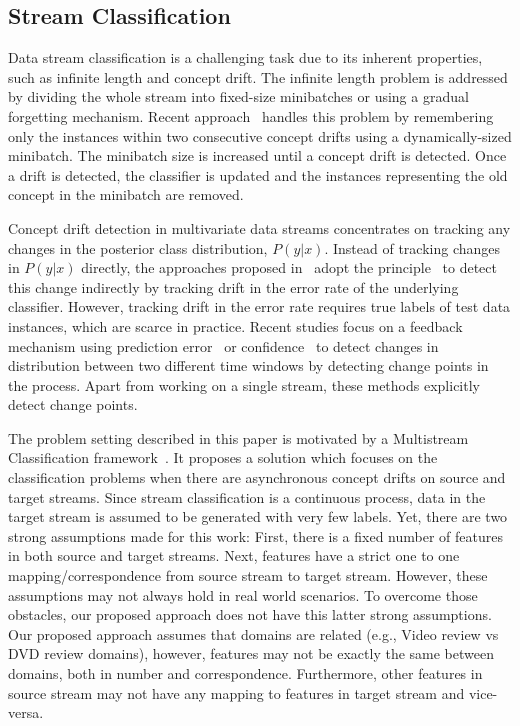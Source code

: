 \subsection{Stream Classification}
Data stream classification is a challenging task due to its inherent properties, such as infinite length and concept drift. The infinite length problem is addressed by dividing the whole stream into fixed-size minibatches or using a gradual forgetting mechanism. Recent approach~\cite{conf/sdm/BifetG07} handles this problem by remembering only the instances within two consecutive concept drifts using a dynamically-sized minibatch. The minibatch size is increased until a concept drift is detected. Once a drift is detected, the classifier is updated and the instances representing the old concept in the minibatch are removed.

Concept drift detection in multivariate data streams concentrates on tracking any changes in the posterior class distribution, $P(y|x)$. Instead of tracking changes in $P(y|x)$ directly, the approaches proposed in~\cite{conf/sbia/GamaMCR04} adopt the principle~\cite{haque2018framework} to detect this change indirectly by tracking drift in the error rate of the underlying classifier. However, tracking drift in the error rate requires true labels of test data instances, which are scarce in practice. Recent studies focus on a feedback mechanism using prediction error~\cite{conf/sbia/GamaMCR04} or confidence~\cite{chandra2016adaptive} to detect changes in distribution between two different time windows by detecting change points in the process. Apart from working on a single stream, these methods explicitly detect change points.

The problem setting described in this paper is motivated by a Multistream Classification framework~\cite{chandra2016adaptive}. It proposes a solution which focuses on the classification problems when there are asynchronous concept drifts on source and target streams. Since stream classification is a continuous process, data in the target stream is assumed to be generated with very few labels. Yet, there are two strong assumptions made for this work: First, there is a fixed number of features in both source and target streams. Next, features have a strict one to one mapping/correspondence from source stream to target stream. However, these assumptions may not always hold in real world scenarios. To overcome those obstacles, our proposed approach does not have this latter strong assumptions. Our proposed approach assumes that domains are related (e.g., Video review vs DVD review domains), however,  features may not be exactly the same between domains, both in number and correspondence. Furthermore, other features in source stream may not have any mapping to features in target stream and vice-versa. 


